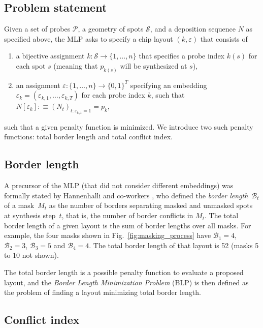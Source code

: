 \documentclass{w-edbk}
\newcommand{\eps}{\varepsilon}
\begin{document}
\subsection{Problem statement}

Given a set of probes $\mathcal{P}$, a geometry of spots $\mathcal{S}$,
and a deposition sequence $N$ as specified above, the MLP asks to
specify a chip layout $(k,\eps)$ that consists of
\begin{enumerate}
\item a bijective assignment $k: \mathcal{S}\to \{1,\dots,n\}$ that
  specifies a probe index $k(s)$ for each spot $s$ (meaning that
  $p_{k(s)}$ will be synthesized at $s$),
\item an assignment $\eps: \{1,\dots,n\}\to \{0,1\}^T$ specifying an
  embedding $\eps_k = (\eps_{k,1},\dots,\eps_{k,T})$ for each
  probe index $k$, such that $N[\eps_k] :\equiv (N_t)_{t:
    \eps_{k,t}=1} = p_k$,
\end{enumerate}
such that a given penalty function is minimized.  We introduce two
such penalty functions: total border length and total conflict index.



\subsection{Border length}

A precursor of the MLP (that did not consider different embeddings)
was formally stated by Hannenhalli and co-workers \citep{Hannenhalli2002},
who defined
the \emph{border length}~$\mathcal{B}_t$ of a mask~$M_{t}$ as the
number of borders separating masked and unmasked spots at synthesis
step~$t$, that is, the number of border
conflicts in $M_{t}$. The total border length of a given layout is the
sum of border lengths over all masks. For example, the four masks
shown in Fig.~\ref{fig:masking_process} have $\mathcal{B}_1 = 4$,
$\mathcal{B}_2 = 3$, $\mathcal{B}_3 = 5$ and $\mathcal{B}_4 = 4$. The
total border length of that layout is 52 (masks 5 to 10 not shown).

The total border length is a possible penalty function to evaluate a
proposed layout, and the \emph{Border Length Minimization Problem}
(BLP) is then defined as the problem of finding a layout minimizing
total border length.


\subsection{Conflict index}
\end{document}
